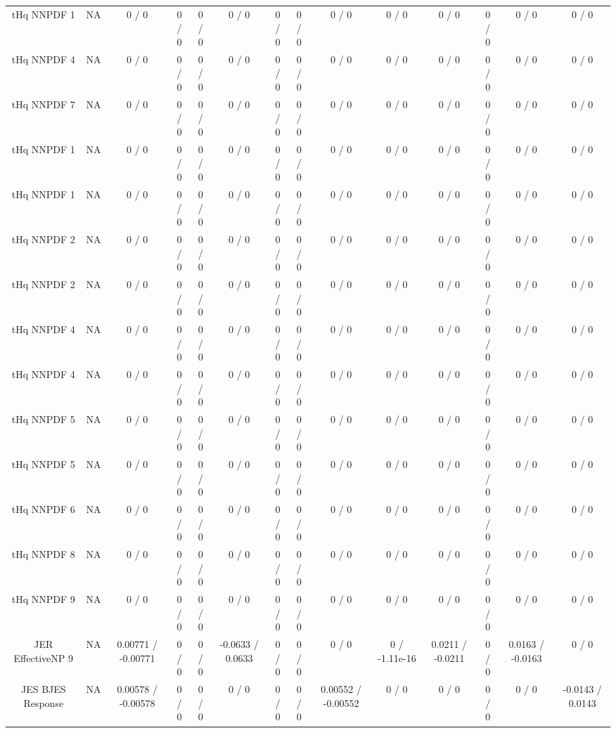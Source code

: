 \documentclass[10pt]{article}
\begin{document}
\begin{table}[htbp]
\begin{center}
\begin{tabular}{|c|c|c|c|c|c|c|c|c|c|c|c|c|c|}
  tHq NNPDF 1 &    NA    & 0 / 0 & 0 / 0 & 0 / 0 & 0 / 0 & 0 / 0 & 0 / 0 & 0 / 0 & 0 / 0 & 0 / 0 & 0 / 0 & 0 / 0 & 0 / 0 \\ 
  tHq NNPDF 4 &    NA    & 0 / 0 & 0 / 0 & 0 / 0 & 0 / 0 & 0 / 0 & 0 / 0 & 0 / 0 & 0 / 0 & 0 / 0 & 0 / 0 & 0 / 0 & 0 / 0 \\ 
  tHq NNPDF 7 &    NA    & 0 / 0 & 0 / 0 & 0 / 0 & 0 / 0 & 0 / 0 & 0 / 0 & 0 / 0 & 0 / 0 & 0 / 0 & 0 / 0 & 0 / 0 & 0 / 0 \\ 
  tHq NNPDF 1 &    NA    & 0 / 0 & 0 / 0 & 0 / 0 & 0 / 0 & 0 / 0 & 0 / 0 & 0 / 0 & 0 / 0 & 0 / 0 & 0 / 0 & 0 / 0 & 0 / 0 \\ 
  tHq NNPDF 1 &    NA    & 0 / 0 & 0 / 0 & 0 / 0 & 0 / 0 & 0 / 0 & 0 / 0 & 0 / 0 & 0 / 0 & 0 / 0 & 0 / 0 & 0 / 0 & 0 / 0 \\ 
  tHq NNPDF 2 &    NA    & 0 / 0 & 0 / 0 & 0 / 0 & 0 / 0 & 0 / 0 & 0 / 0 & 0 / 0 & 0 / 0 & 0 / 0 & 0 / 0 & 0 / 0 & 0 / 0 \\ 
  tHq NNPDF 2 &    NA    & 0 / 0 & 0 / 0 & 0 / 0 & 0 / 0 & 0 / 0 & 0 / 0 & 0 / 0 & 0 / 0 & 0 / 0 & 0 / 0 & 0 / 0 & 0 / 0 \\ 
  tHq NNPDF 4 &    NA    & 0 / 0 & 0 / 0 & 0 / 0 & 0 / 0 & 0 / 0 & 0 / 0 & 0 / 0 & 0 / 0 & 0 / 0 & 0 / 0 & 0 / 0 & 0 / 0 \\ 
  tHq NNPDF 4 &    NA    & 0 / 0 & 0 / 0 & 0 / 0 & 0 / 0 & 0 / 0 & 0 / 0 & 0 / 0 & 0 / 0 & 0 / 0 & 0 / 0 & 0 / 0 & 0 / 0 \\ 
  tHq NNPDF 5 &    NA    & 0 / 0 & 0 / 0 & 0 / 0 & 0 / 0 & 0 / 0 & 0 / 0 & 0 / 0 & 0 / 0 & 0 / 0 & 0 / 0 & 0 / 0 & 0 / 0 \\ 
  tHq NNPDF 5 &    NA    & 0 / 0 & 0 / 0 & 0 / 0 & 0 / 0 & 0 / 0 & 0 / 0 & 0 / 0 & 0 / 0 & 0 / 0 & 0 / 0 & 0 / 0 & 0 / 0 \\ 
  tHq NNPDF 6 &    NA    & 0 / 0 & 0 / 0 & 0 / 0 & 0 / 0 & 0 / 0 & 0 / 0 & 0 / 0 & 0 / 0 & 0 / 0 & 0 / 0 & 0 / 0 & 0 / 0 \\ 
  tHq NNPDF 8 &    NA    & 0 / 0 & 0 / 0 & 0 / 0 & 0 / 0 & 0 / 0 & 0 / 0 & 0 / 0 & 0 / 0 & 0 / 0 & 0 / 0 & 0 / 0 & 0 / 0 \\ 
  tHq NNPDF 9 &    NA    & 0 / 0 & 0 / 0 & 0 / 0 & 0 / 0 & 0 / 0 & 0 / 0 & 0 / 0 & 0 / 0 & 0 / 0 & 0 / 0 & 0 / 0 & 0 / 0 \\ 
  JER EffectiveNP 9 &    NA    & 0.00771 / -0.00771 & 0 / 0 & 0 / 0 & -0.0633 / 0.0633 & 0 / 0 & 0 / 0 & 0 / 0 & 0 / -1.11e-16 & 0.0211 / -0.0211 & 0 / 0 & 0.0163 / -0.0163 & 0 / 0 \\ 
  JES BJES Response &    NA    & 0.00578 / -0.00578 & 0 / 0 & 0 / 0 & 0 / 0 & 0 / 0 & 0 / 0 & 0.00552 / -0.00552 & 0 / 0 & 0 / 0 & 0 / 0 & 0 / 0 & -0.0143 / 0.0143 \\ 

\end{tabular}
\end{center}
\end{table}
\end{document}
